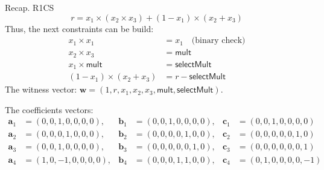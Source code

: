 \documentclass{zkdl-presentation-template}
\begin{document}
    \begin{frame}{Recap. R1CS}
        \vspace{-10pt}
        \begin{equation*}
            r = x_1 \times (x_2 \times x_3) + (1 - x_1) \times (x_2 + x_3)
        \end{equation*}
        Thus, the next constraints can be build:
        \vspace{-5pt}
        \begin{align*}
            x_1 \times x_1 &= x_1 \quad \text{(binary check)} \tag{1} \\
            x_2 \times x_3 &= \mathsf{mult} \tag{2} \\
            x_1 \times \mathsf{mult} &= \mathsf{selectMult} \tag{3} \\
            (1 - x_1) \times (x_2 + x_3) &= r - \mathsf{selectMult} \tag{4}
        \end{align*}
        The witness vector: $\boldsymbol{w} = (1, r, x_1, x_2, x_3, \mathsf{mult}, \mathsf{selectMult})$.
        
        \vspace{2pt}
        The coefficients vectors:
        \vspace{-25pt}
        {\center\small\begin{align*}
            \boldsymbol{a}_1 &= (0, 0, 1, 0, 0, 0, 0), & \boldsymbol{b}_1 &= (0, 0, 1, 0, 0, 0, 0), & \boldsymbol{c}_1 &= (0, 0, 1, 0, 0, 0, 0) \\
            \boldsymbol{a}_2 &= (0, 0, 0, 1, 0, 0, 0), & \boldsymbol{b}_2 &= (0, 0, 0, 0, 1, 0, 0), & \boldsymbol{c}_2 &= (0, 0, 0, 0, 0, 1, 0) \\
            \boldsymbol{a}_3 &= (0, 0, 1, 0, 0, 0, 0), & \boldsymbol{b}_3 &= (0, 0, 0, 0, 0, 1, 0), & \boldsymbol{c}_3 &= (0, 0, 0, 0, 0, 0, 1) \\
            \boldsymbol{a}_4 &= (1, 0, -1, 0, 0, 0, 0), & \boldsymbol{b}_4 &= (0, 0, 0, 1, 1, 0, 0), & \boldsymbol{c}_4 &= (0, 1, 0, 0, 0, 0, -1)
        \end{align*}}
    \end{frame}
    
\end{document}
